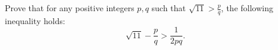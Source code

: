 Prove that for any positive integers $p,q$ such that $\sqrt{11}>\frac{p}{q}$,  the following inequality holds:\[\sqrt{11}-\frac{p}{q}>\frac{1}{2pq}.\]